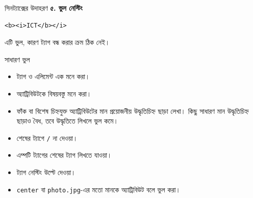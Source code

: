 \begin{examplebox}{সিনট্যাক্সের উদাহরণ}
\vspace{3pt}
\textbf{৫. ভুল নেস্টিং}
\par\noindent\begin{minipage}{\linewidth}
\begin{verbatim}
<b><i>ICT</b></i>
\end{verbatim}
\end{minipage}\par
এটি ভুল, কারণ ট্যাগ বন্ধ করার ক্রম ঠিক নেই।
\end{examplebox}

\begin{mistakebox}{সাধারণ ভুল}
\begin{itemize}
\item ট্যাগ ও এলিমেন্ট এক মনে করা।
\item অ্যাট্রিবিউটকে বিষয়বস্তু মনে করা।
\item ফাঁক বা বিশেষ চিহ্নযুক্ত অ্যাট্রিবিউটের মান প্রয়োজনীয় উদ্ধৃতিচিহ্ন ছাড়া লেখা। কিছু সাধারণ মান উদ্ধৃতিচিহ্ন ছাড়াও বৈধ, তবে উদ্ধৃতিতে লিখলে ভুল কমে।
\item শেষের ট্যাগে \texttt{/} না দেওয়া।
\item এম্পটি ট্যাগের শেষের ট্যাগ লিখতে যাওয়া।
\item ট্যাগ নেস্টিং উল্টে দেওয়া।
\item \texttt{center} বা \texttt{photo.jpg}-এর মতো মানকে অ্যাট্রিবিউট বলে ভুল করা।
\end{itemize}
\end{mistakebox}

